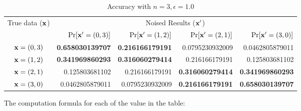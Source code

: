 \documentclass{article}
\begin{document}
\begin{table}[htbp]
	\footnotesize
	\centering
	\caption{Accuracy with $n = 3, \epsilon = 1.0$}
	\label{tab_n3prob}
\begin{tabular}{|c||r|r|r|r|}
	\hline

	\multirow{2}{*}{True data ($\textbf{x}$)}
								& \multicolumn{4}{c|}{Noised Results ($\textbf{x}'$)}  
								\\ \cline{2-5}
	                      		&  $\Pr[\textbf{x}' = (0, 3)]$  	
	                      		&  $\Pr[\textbf{x}' = (1, 2)]$ 	
	                      		&  $\Pr[\textbf{x}' = (2, 1)]$ 	
	                      		&  $\Pr[\textbf{x}' = (3, 0)]$ 	
	                      		\\  \hline
	                      		\hline
	$\textbf{x} = (0,3)$          & {\bf 0.658030139707}	
								& {\bf 0.216166179191}	
								&  0.0795230932009
								&  0.0462805879011
								\\  \hline
	$\textbf{x} = (1,2)$          & {\bf 0.341969860293}	
								& {\bf 0.316060279414}			
								&  0.216166179191
								&  0.125803681102
								\\  \hline
	$\textbf{x} = (2,1)$          & 0.125803681102
								& 0.216166179191			
								& {\bf 0.316060279414}
								& {\bf 0.341969860293} 
								\\  \hline
	$\textbf{x} = (3,0)$          & 0.0462805879011
								& 0.0795230932009 			
								& {\bf 0.216166179191}
								& {\bf 0.658030139707} 
								\\  \hline
\end{tabular}
\end{table}


The computation formula for each of the value in the table:
\end{document}
